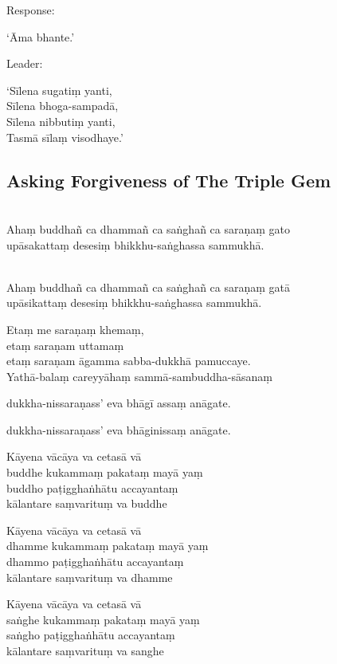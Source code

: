 \begin{instruction}
  Response:
\end{instruction}

‘Āma bhante.’

\begin{instruction}
  Leader:
\end{instruction}

‘Sīlena sugatiṃ yanti,\\
Sīlena bhoga-sampadā,\\
Sīlena nibbutiṃ yanti,\\
Tasmā sīlaṃ visodhaye.’

\ifhandbookedition
\clearpage
\fi

\subsection{Asking Forgiveness of The Triple Gem}

\\\relax
Ahaṃ buddhañ ca dhammañ ca saṅghañ ca saraṇaṃ gato\\
upāsakattaṃ desesiṃ bhikkhu-saṅghassa sammukhā.

\\\relax
Ahaṃ buddhañ ca dhammañ ca saṅghañ ca saraṇaṃ gatā\\
upāsikattaṃ desesiṃ bhikkhu-saṅghassa sammukhā.

Etaṃ me saraṇaṃ khemaṃ,\\
etaṃ saraṇam uttamaṃ\\
etaṃ saraṇam āgamma sabba-dukkhā pamuccaye.\\
Yathā-balaṃ careyyāhaṃ sammā-sambuddha-sāsanaṃ

%
dukkha-nissaraṇass' eva bhāgī assaṃ anāgate.

%
dukkha-nissaraṇass' eva bhāginissaṃ anāgate.

Kāyena vācāya va cetasā vā\\
buddhe kukammaṃ pakataṃ mayā yaṃ\\
buddho paṭigghaṅhātu accayantaṃ\\
kālantare saṃvarituṃ va buddhe

Kāyena vācāya va cetasā vā\\
dhamme kukammaṃ pakataṃ mayā yaṃ\\
dhammo paṭigghaṅhātu accayantaṃ\\
kālantare saṃvarituṃ va dhamme

Kāyena vācāya va cetasā vā\\
saṅghe kukammaṃ pakataṃ mayā yaṃ\\
saṅgho paṭigghaṅhātu accayantaṃ\\
kālantare saṃvarituṃ va sanghe

